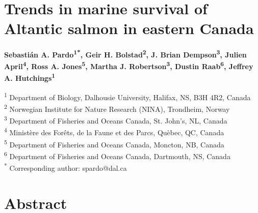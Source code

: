 \documentclass[12pt]{article}
\begin{document}
\linenumbers


\section*{Trends in marine survival of Altantic salmon in eastern Canada}

\textbf{Sebasti\'{a}n A. Pardo\textsuperscript{1*}, 
        Geir H. Bolstad\textsuperscript{2}, 
        J. Brian Dempson\textsuperscript{3}, 
        Julien April\textsuperscript{4}, 
        Ross A. Jones\textsuperscript{5}, 
        Martha J. Robertson\textsuperscript{3}, 
        Dustin Raab\textsuperscript{6}, 
Jeffrey A. Hutchings\textsuperscript{1}} 

\noindent\small{\textsuperscript{1} Department of Biology, Dalhousie University, Halifax, NS, B3H 4R2, Canada\\}
\small{\textsuperscript{2} Norwegian Institute for Nature Research (NINA), Trondheim, Norway\\}
\small{\textsuperscript{3} Department of Fisheries and Oceans Canada, St. John's, NL, Canada\\}
\small{\textsuperscript{4} Minist\`{e}re des For\^{e}ts, de la Faune et des Parcs, Qu\`{e}bec, QC, Canada\\}
\small{\textsuperscript{5} Department of Fisheries and Oceans Canada, Moncton, NB, Canada\\}
\small{\textsuperscript{6} Department of Fisheries and Oceans Canada, Dartmouth, NS, Canada\\}
\small{\textsuperscript{*} Corresponding author: spardo@dal.ca}

\section*{Abstract}
\end{document}
